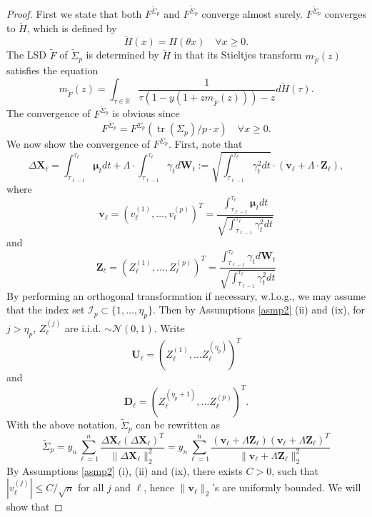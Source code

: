 \documentclass[a4paper,11pt]{article}
\theoremstyle{plain}
\theoremstyle{definition}
\newcommand{\MR}{\mathbb{R}}
\newcommand{\tr}{\operatorname{tr}}
\begin{document}
    \begin{proof}
    	First we state that both $F^{\breve{\Sigma}_p}$ and $F^{\widetilde{\Sigma}_p}$ converge almost surely. $F^{\breve{\Sigma}_p}$ converges to $\breve{H}$, which is defined by
    	\[\breve{H}(x) = H(\theta x) \quad \forall x \geq 0.  \]
    	The LSD $\widetilde{F}$ of $\widetilde{\Sigma}_p$ is determined by $\breve{H}$ in that its Stieltjes transform $m_{\widetilde{F}}(z)$ satisfies the equation
    	\[ m_{\widetilde{F}}(z) = \int_{\tau \in \MR} \frac{1}{ \tau(1- y(1 + zm_{\widetilde{F}}(z))) - z } d\breve{H}(\tau). \]
    	The convergence of $F^{\breve{\Sigma}_p}$ is obvious since
    	\[ F^{\breve{\Sigma}_p} = F^{\Sigma_p}(\tr(\Sigma_p)/p \cdot x) \quad \forall x \geq 0.  \]
    	We now show the convergence of $F^{\Sigma_p}$. First, note that
    	\[ \Delta \mathbf{X}_\ell = \int_{\tau_{\ell-1}}^{\tau_\ell} \boldsymbol{\mu}_t dt + \Lambda \cdot \int_{\tau_{\ell-1}}^{\tau_\ell} \gamma_t d\mathbf{W}_t := \sqrt{\int_{\tau_{\ell-1}}^{\tau_\ell} \gamma_t^2 dt}\cdot (\mathbf{v}_\ell + \Lambda \cdot \mathbf{Z}_\ell), \]
    	where
    	\[ \mathbf{v}_\ell = (v_\ell^{(1)}, \dots, v_\ell^{(p)})^T = \frac{\int_{\tau_{\ell-1}}^{\tau_\ell} \boldsymbol{\mu}_t dt}{\sqrt{\int_{\tau_{\ell-1}}^{\tau_\ell} \gamma_t^2 dt}} \]
    	and
    	\[ \mathbf{Z}_\ell = (Z_\ell^{(1)}, \dots, Z_\ell^{(p)})^T = \frac{\int_{\tau_{\ell-1}}^{\tau_\ell} \gamma_t d\mathbf{W}_t}{\sqrt{\int_{\tau_{\ell-1}}^{\tau_\ell} \gamma_t^2 dt}} \]
    	By performing an orthogonal transformation if necessary, w.l.o.g., we may assume that the index set $\mathcal{I}_p \subset \{ 1, \dots, \eta_p \} $. Then by Assumptions \ref{asmp2} (ii) and (ix), for $j > \eta_p$, $Z_\ell^{(j)}$ are i.i.d. $\sim \mathcal{N}(0, 1)$. Write
    	\[ \mathbf{U}_\ell = (Z_\ell^{(1)}, \dots Z_\ell^{(\eta_p)})^T \]
    	and 
    	\[ \mathbf{D}_\ell = (Z_\ell^{(\eta_p+1)}, \dots Z_\ell^{(p)})^T.\]
    	With the above notation, $\widetilde{\Sigma}_p$ can be rewritten as
    	\begin{equation}
    	\widetilde{\Sigma}_p = y_n \sum_{\ell=1}^{n} \frac{\Delta \mathbf{X}_\ell (\Delta \mathbf{X}_\ell)^T}{\|\Delta \mathbf{X}_\ell\|_2^2} = y_n \sum_{\ell=1}^{n} \frac{(\mathbf{v}_\ell + \Lambda \mathbf{Z}_\ell) (\mathbf{v}_\ell + \Lambda \mathbf{Z}_\ell)^T}{\|\mathbf{v}_\ell + \Lambda \mathbf{Z}_\ell\|_2^2}
    	\end{equation}
    	By Assumptions \ref{asmp2} (i), (ii) and (ix), there exists $C > 0$, such that $|v_\ell^{(j)}| \leq C / \sqrt{n}$ for all $j$ and $\ell$, hence $\| \mathbf{v}_\ell\|_2$'s are uniformly bounded. We will show that

\end{proof}
\end{document}
